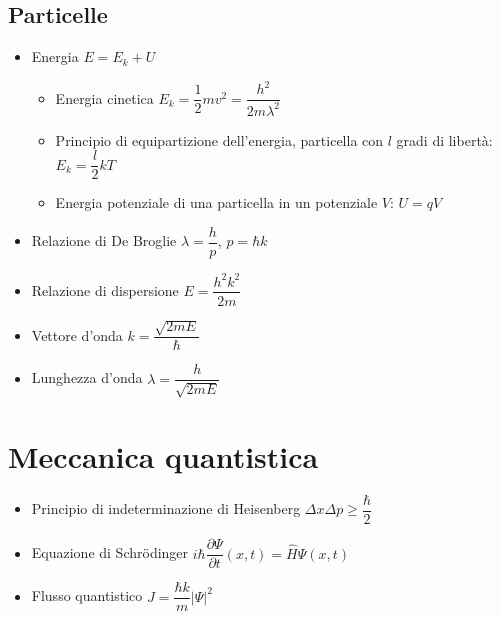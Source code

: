 \documentclass{article}
\begin{document}
\newpage

\subsection{Particelle}
\begin{itemize}
  \item Energia \( E = E_k + U \)
        \begin{itemize}
          \item Energia cinetica \( E_k = \dfrac{1}{2} m v ^ 2 = \dfrac{h ^ 2}{2 m \lambda ^ 2 }\)
          \item Principio di equipartizione dell'energia, particella con \( l \) gradi di libertà: \( E_k = \dfrac{l}{2} k T \)
          \item Energia potenziale di una particella in un potenziale \( V \): \( U = qV \)
        \end{itemize}
  \item Relazione di De Broglie \( \lambda = \dfrac{h}{p} \), \( p = \hbar k \)
  \item Relazione di dispersione \( E = \dfrac{h ^ 2 k ^ 2}{2 m} \)
  \item Vettore d'onda \( \displaystyle k = \dfrac{\sqrt{2mE}}{\hbar} \)
  \item Lunghezza d'onda \( \displaystyle \lambda = \dfrac{h}{\sqrt{2mE}} \)
\end{itemize}

\newpage

\section{Meccanica quantistica}
\begin{itemize}
  \item Principio di indeterminazione di Heisenberg \( \Delta x \Delta p \geq \dfrac{\hbar}{2} \)
  \item Equazione di Schrödinger \( i \hbar \dfrac{\partial \Psi}{\partial t} (x, t) = \hat{H} \Psi (x,t) \)
  \item Flusso quantistico \( J = \dfrac{\hbar k}{m} \left| \Psi \right| ^ 2 \)
\end{itemize}
\end{document}

